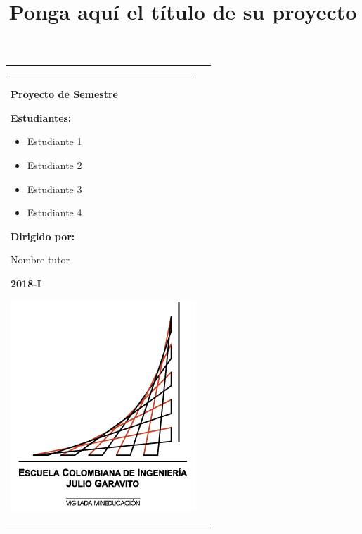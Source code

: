 \documentclass[12pt, twoside]{article} %
\begin{document}
\begin{titlepage}
\title{Ponga aquí el título de su proyecto} %
\date{}
\maketitle
\noindent\begin{tabular}{p{4.5cm} p{11cm}}
\textcolor{td}{\rule{4.5cm}{0.04cm}} 
\par\medskip
\textbf{Proyecto de Semestre}
\par\bigskip
\textbf{Estudiantes:}
\begin{itemize}
\item Estudiante 1
\item Estudiante 2
\item Estudiante 3
\item Estudiante 4
\end{itemize}
\par\medskip
\textbf{Dirigido por:}
\par\medskip \hspace{0.5cm}
\textrm{Nombre tutor}
\par\medskip
\begin{center}
\textbf{2018-I}
\end{center}
\vspace{3cm} 
\includegraphics[scale=0.5]{logo.png}

\end{tabular}
\end{titlepage}
\end{document}
